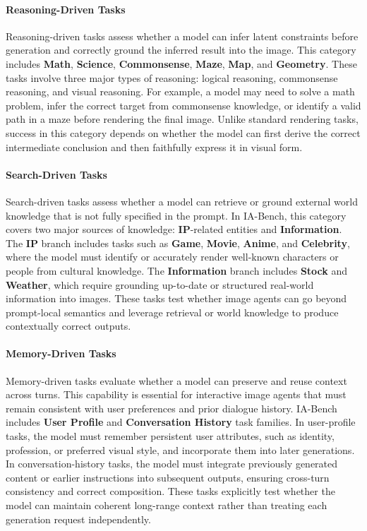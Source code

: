 \paragraph{Reasoning-Driven Tasks}
Reasoning-driven tasks assess whether a model can infer latent constraints before generation and correctly ground the inferred result into the image. This category includes \textbf{Math}, \textbf{Science}, \textbf{Commonsense}, \textbf{Maze}, \textbf{Map}, and \textbf{Geometry}. These tasks involve three major types of reasoning: logical reasoning, commonsense reasoning, and visual reasoning. For example, a model may need to solve a math problem, infer the correct target from commonsense knowledge, or identify a valid path in a maze before rendering the final image. Unlike standard rendering tasks, success in this category depends on whether the model can first derive the correct intermediate conclusion and then faithfully express it in visual form.

\paragraph{Search-Driven Tasks}
Search-driven tasks assess whether a model can retrieve or ground external world knowledge that is not fully specified in the prompt. In IA-Bench, this category covers two major sources of knowledge: \textbf{IP}-related entities and \textbf{Information}. The \textbf{IP} branch includes tasks such as \textbf{Game}, \textbf{Movie}, \textbf{Anime}, and \textbf{Celebrity}, where the model must identify or accurately render well-known characters or people from cultural knowledge. The \textbf{Information} branch includes \textbf{Stock} and \textbf{Weather}, which require grounding up-to-date or structured real-world information into images. These tasks test whether image agents can go beyond prompt-local semantics and leverage retrieval or world knowledge to produce contextually correct outputs.

\paragraph{Memory-Driven Tasks}
Memory-driven tasks evaluate whether a model can preserve and reuse context across turns. This capability is essential for interactive image agents that must remain consistent with user preferences and prior dialogue history. IA-Bench includes \textbf{User Profile} and \textbf{Conversation History} task families. In user-profile tasks, the model must remember persistent user attributes, such as identity, profession, or preferred visual style, and incorporate them into later generations. In conversation-history tasks, the model must integrate previously generated content or earlier instructions into subsequent outputs, ensuring cross-turn consistency and correct composition. These tasks explicitly test whether the model can maintain coherent long-range context rather than treating each generation request independently.

